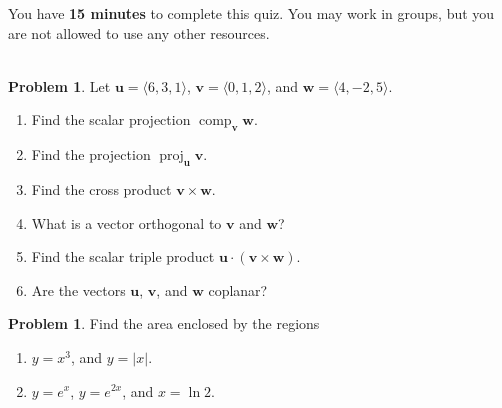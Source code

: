 \documentclass[12pt]{article}
\theoremstyle{plain}
\theoremstyle{definition}
\newtheorem{problem}[exercise]{Problem}
\theoremstyle{remark}
\DeclareMathOperator{\proj}{proj}
\DeclareMathOperator{\comp}{comp}
\newcommand{\bfu}{\mathbf{u}}
\newcommand{\bfv}{\mathbf{v}}
\newcommand{\bfw}{\mathbf{w}}
\begin{document}
\author{TA: \href{mailto:\authoremail}{\documentauthor}}
\title{\documenttitle}
\date{\today}
\maketitle

You have \textbf{15 minutes} to complete this quiz. You may work in groups,
but you are not allowed to use any other resources.
\\\\
\begin{problem}
\label{prob:1}
Let $\bfu=\langle 6,3,1\rangle$, $\bfv=\langle 0,1,2\rangle$, and
$\bfw=\langle 4,-2,5\rangle$.
\begin{enumerate}[label=(\roman*)]
\item \label{prob:1-i}Find the scalar projection $\comp_{\bfv}\bfw$.
\item \label{prob:1-ii} Find the projection $\proj_{\bfu}\bfv$.
\item \label{prob:1-iii} Find the cross product $\bfv\times\bfw$.
\item \label{prob:1-iv} What is a vector orthogonal to $\bfv$ and $\bfw$?
\item \label{prob:1-v}Find the scalar triple product $\bfu\cdot(\bfv\times\bfw)$.
\item \label{prob:1-vi} Are the vectors $\bfu$, $\bfv$, and $\bfw$ coplanar?
\end{enumerate}
\end{problem}
\bigskip
\begin{problem}%
\label{prob:2}
Find the area enclosed by the regions
\begin{enumerate}[label=(\roman*)]
\item \label{prob:2-i} $y=x^3$, and $y=|x|$.
\item \label{prob:2-ii} $y=e^x$, $y=e^{2x}$, and $x=\ln 2$.
\end{enumerate}
\end{problem}
\newpage
\end{document}
